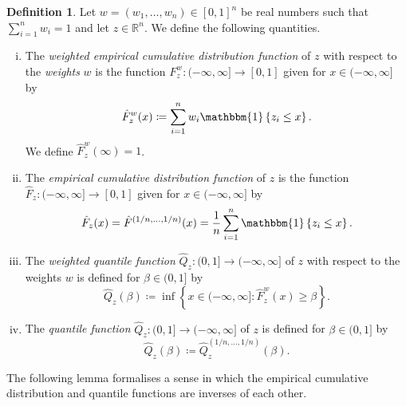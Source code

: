 \documentclass[11pt, titlepage]{article} %
\newcommand{\Ind}[1]{\mathbbm{1}\left\{ #1 \right\}}
\numberwithin{equation}{section}
\theoremstyle{definition}
\newtheorem{definition}{Definition}
\numberwithin{theorem}{section}
\numberwithin{lemma}{section}
\numberwithin{corollary}{section}
\numberwithin{proposition}{section}
\numberwithin{definition}{section}
\numberwithin{remark}{section}
\begin{document}

\begin{definition}
    Let \(w = (w_1, \ldots, w_n) \in [0,1]^n\) be real numbers such that \(\sum_{i=1}^n w_i = 1\) and let \(z \in \mathbb{R}^n\). We define the following quantities. \begin{enumerate}[(i)] \itemsep0em
        \item The \textit{weighted empirical cumulative distribution function} of \(z\) with respect to the \textit{weights} \(w\) is the function \(F^w_z: (-\infty, \infty] \to [0,1]\) given for \(x \in (-\infty, \infty]\) by \[\hat{F}^{w}_z(x) \coloneqq \sum_{i=1}^n w_i \Ind{z_i \leq x}.  \] We define \(\hat{F}^w_z(\infty) = 1\).
        \item The \textit{empirical cumulative distribution function} of \(z\) is the function \(\hat{F}_z: (-\infty, \infty] \to [0,1]\) given for \(x \in (-\infty, \infty]\) by \[\hat{F}_z(x) = \hat{F}^{(1/n, \ldots, 1/n)}(x) = \frac{1}{n}\sum_{i=1}^n \Ind{z_i \leq x}.\]
        \item The \textit{weighted quantile function} \(\hat{Q}_z:(0,1] \to (-\infty, \infty]\) of \(z\) with respect to the weights \(w\) is defined for \(\beta \in (0,1]\) by \[\hat{Q}_z(\beta) \coloneqq \inf \left\{ x \in (-\infty, \infty]: \hat{F}^w_z(x) \geq \beta \right\}.\]
        \item The \textit{quantile function} \(\hat{Q}_z:(0,1] \to (-\infty, \infty]\) of \(z\) is defined for \(\beta \in (0,1]\) by \[\hat{Q}_z(\beta) \coloneqq \hat{Q}^{(1/n, \ldots, 1/n)}_z(\beta).\]
    \end{enumerate}
\label{defn:empirical_cdfquantile}
\end{definition}

\noindent
The following lemma formalises a sense in which the empirical cumulative distribution and quantile functions are inverses of each other.
\end{document}
